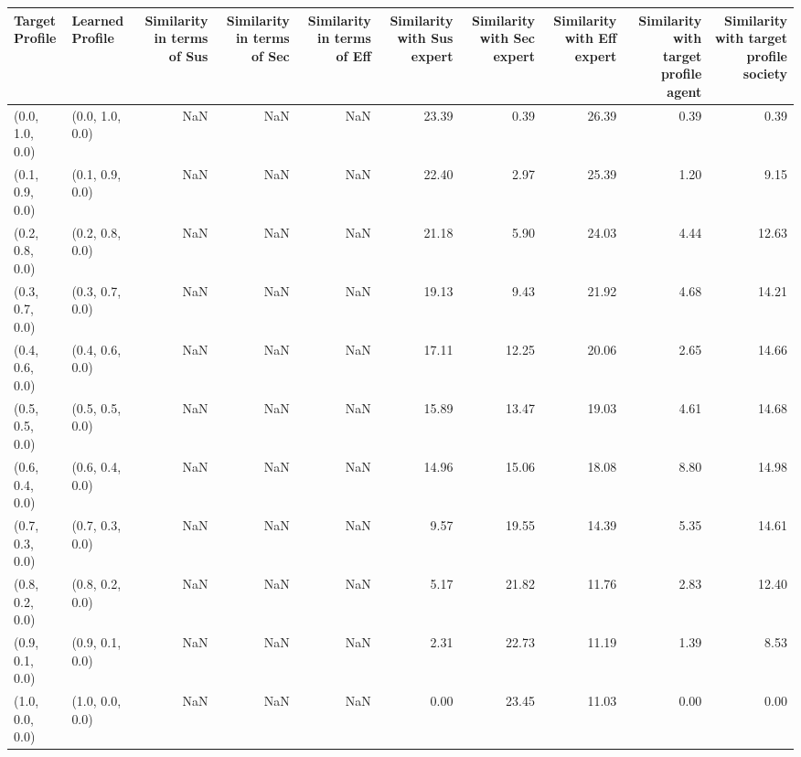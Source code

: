 \begin{tabular}{llrrrrrrrr}
\toprule
Target Profile & Learned Profile & Similarity in terms of Sus & Similarity in terms of Sec & Similarity in terms of Eff & Similarity with Sus expert & Similarity with Sec expert & Similarity with Eff expert & Similarity with target profile agent & Similarity with target profile society \\
\midrule
(0.0, 1.0, 0.0) & (0.0, 1.0, 0.0) & NaN & NaN & NaN & 23.39 & 0.39 & 26.39 & 0.39 & 0.39 \\
(0.1, 0.9, 0.0) & (0.1, 0.9, 0.0) & NaN & NaN & NaN & 22.40 & 2.97 & 25.39 & 1.20 & 9.15 \\
(0.2, 0.8, 0.0) & (0.2, 0.8, 0.0) & NaN & NaN & NaN & 21.18 & 5.90 & 24.03 & 4.44 & 12.63 \\
(0.3, 0.7, 0.0) & (0.3, 0.7, 0.0) & NaN & NaN & NaN & 19.13 & 9.43 & 21.92 & 4.68 & 14.21 \\
(0.4, 0.6, 0.0) & (0.4, 0.6, 0.0) & NaN & NaN & NaN & 17.11 & 12.25 & 20.06 & 2.65 & 14.66 \\
(0.5, 0.5, 0.0) & (0.5, 0.5, 0.0) & NaN & NaN & NaN & 15.89 & 13.47 & 19.03 & 4.61 & 14.68 \\
(0.6, 0.4, 0.0) & (0.6, 0.4, 0.0) & NaN & NaN & NaN & 14.96 & 15.06 & 18.08 & 8.80 & 14.98 \\
(0.7, 0.3, 0.0) & (0.7, 0.3, 0.0) & NaN & NaN & NaN & 9.57 & 19.55 & 14.39 & 5.35 & 14.61 \\
(0.8, 0.2, 0.0) & (0.8, 0.2, 0.0) & NaN & NaN & NaN & 5.17 & 21.82 & 11.76 & 2.83 & 12.40 \\
(0.9, 0.1, 0.0) & (0.9, 0.1, 0.0) & NaN & NaN & NaN & 2.31 & 22.73 & 11.19 & 1.39 & 8.53 \\
(1.0, 0.0, 0.0) & (1.0, 0.0, 0.0) & NaN & NaN & NaN & 0.00 & 23.45 & 11.03 & 0.00 & 0.00 \\
\bottomrule
\end{tabular}
